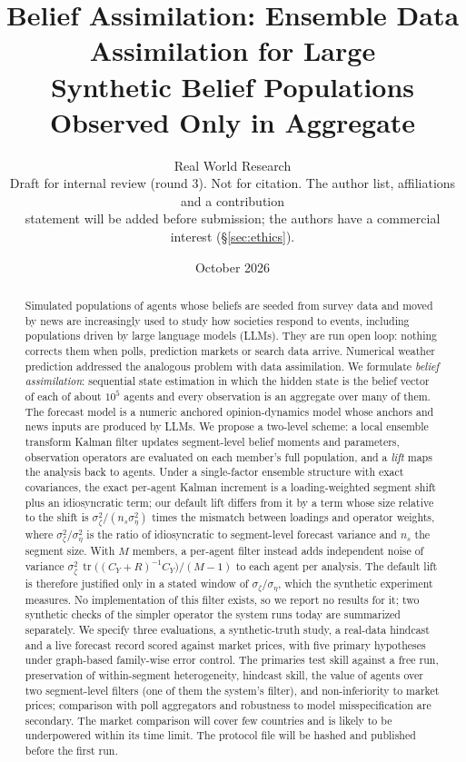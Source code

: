 \documentclass[10pt]{article}
\title{Belief Assimilation: Ensemble Data Assimilation for Large\\ Synthetic Belief Populations Observed Only in Aggregate}
\author{Real World Research\\ \small Draft for internal review (round 3). Not for citation. The author list, affiliations and a contribution\\ \small statement will be added before submission; the authors have a commercial interest (\S\ref{sec:ethics}).}
\date{October 2026}
\theoremstyle{remark}
\newcommand{\tr}{\operatorname{tr}}
\begin{document}
\maketitle

\begin{abstract}
Simulated populations of agents whose beliefs are seeded from survey data and moved by news are increasingly used to study how societies respond to events, including populations driven by large language models (LLMs). They are run open loop: nothing corrects them when polls, prediction markets or search data arrive. Numerical weather prediction addressed the analogous problem with data assimilation. We formulate \emph{belief assimilation}: sequential state estimation in which the hidden state is the belief vector of each of about $10^5$ agents and every observation is an aggregate over many of them. The forecast model is a numeric anchored opinion-dynamics model whose anchors and news inputs are produced by LLMs. We propose a two-level scheme: a local ensemble transform Kalman filter updates segment-level belief moments and parameters, observation operators are evaluated on each member's full population, and a \emph{lift} maps the analysis back to agents. Under a single-factor ensemble structure with exact covariances, the exact per-agent Kalman increment is a loading-weighted segment shift plus an idiosyncratic term; our default lift differs from it by a term whose size relative to the shift is $\sigma_\zeta^2/(n_s\sigma_\eta^2)$ times the mismatch between loadings and operator weights, where $\sigma_\zeta^2/\sigma_\eta^2$ is the ratio of idiosyncratic to segment-level forecast variance and $n_s$ the segment size. With $M$ members, a per-agent filter instead adds independent noise of variance $\sigma_\zeta^2\,\tr\big((C_Y+R)^{-1}C_Y\big)/(M-1)$ to each agent per analysis. The default lift is therefore justified only in a stated window of $\sigma_\zeta/\sigma_\eta$, which the synthetic experiment measures. No implementation of this filter exists, so we report no results for it; two synthetic checks of the simpler operator the system runs today are summarized separately. We specify three evaluations, a synthetic-truth study, a real-data hindcast and a live forecast record scored against market prices, with five primary hypotheses under graph-based family-wise error control. The primaries test skill against a free run, preservation of within-segment heterogeneity, hindcast skill, the value of agents over two segment-level filters (one of them the system's filter), and non-inferiority to market prices; comparison with poll aggregators and robustness to model misspecification are secondary. The market comparison will cover few countries and is likely to be underpowered within its time limit. The protocol file will be hashed and published before the first run.
\end{abstract}
\end{document}
